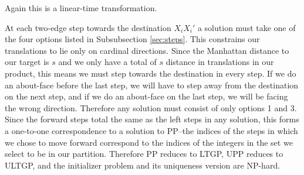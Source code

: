 Again this is a linear-time transformation.

At each two-edge step towards the destination $X_i X_i'$ 
a solution must take one of the four options listed in Subsubsection \ref{sec:steps}.
This constrains our translations to lie only on cardinal directions. Since the Manhattan distance
to our target is $s$ and we only have a total of $s$ distance in translations in our product,
this means we must step towards the destination in every step. If we do an about-face 
before the last step, we will have to step away from the destination on the next step, and if 
we do an about-face on the last step, we will be facing the wrong direction. Therefore any solution must 
consist of only options 1 and 3. Since the forward steps total the same as the left steps in any solution,
this forms a one-to-one correspondence to a solution to PP--the indices of the steps in which we chose to move
forward correspond to the indices of the integers in the set we select to be in our partition.
Therefore PP reduces to LTGP, UPP reduces to ULTGP, and the initializer problem and its uniqueness version
are NP-hard.


